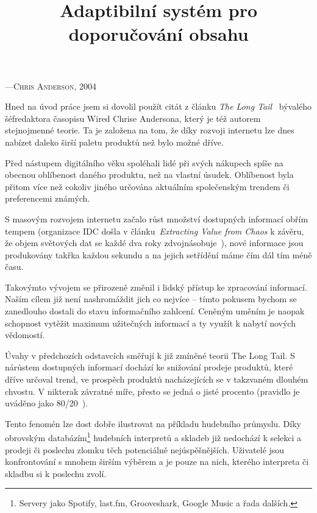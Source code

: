 \documentclass[thesis=M,czech]{FITthesis}[2014/05/07]
\title{Adaptibilní systém pro doporučování obsahu}
\begin{document}

\begin{introduction}
\begin{epigraphs}
%
 {---\textsc{Chris Anderson, 2004}}
 \end{epigraphs}	
	Hned na úvod práce jsem si dovolil použít citát z článku \emph{The Long Tail}~\cite{anderson} bývalého šéfredaktora časopisu Wired Chrise Andersona, který je též autorem stejnojmenné teorie. Ta je založena na tom, že díky rozvoji internetu lze dnes nabízet daleko širší paletu produktů než bylo možné dříve.
	
	Před nástupem digitálního věku spoléhali lidé při svých nákupech spíše na obecnou oblíbenost daného produktu, než na vlastní úsudek. Oblíbenost byla přitom více než cokoliv jiného určována aktuálním společenským trendem či preferencemi známých.	

	S masovým rozvojem internetu začalo růst množství dostupných informací obřím tempem (organizace IDC došla v článku~\emph{Extracting Value from Chaos} k závěru, že objem světových dat se každé dva roky zdvojnásobuje~\cite{digitaluniverse}), nové informace jsou produkovány takřka každou sekundu a na jejich setřídění máme čím dál tím méně času.
	
	Takovýmto vývojem se přirozeně změnil i lidský přístup ke zpracování informací. Naším cílem již není nashromáždit jich co nejvíce – tímto pokusem bychom se zanedlouho dostali do stavu informačního zahlcení. Ceněným uměním je naopak schopnost vytěžit maximum užitečných informací a ty využít k nabytí nových vědomostí.
	
	Úvahy v předchozích odstavcích směřují k již zmíněné teorii The Long Tail. S nárůstem dostupných informací dochází ke snižování prodeje produktů, které dříve určoval trend, ve prospěch produktů nacházejících se v takzvaném dlouhém chvostu. V nikterak závratné míře, přesto se jedná o jisté procento (pravidlo je uváděno jako 80/20~\cite{longtail2}). 
	
	Tento fenomén lze dost dobře ilustrovat na příkladu hudebního průmyslu. Díky obrovským databázím\footnote{Servery jako Spotify, last.fm, Grooveshark, Google Music a řada dalších.} hudebních interpretů a skladeb již nedochází k selekci a prodeji či poslechu zlomku těch potenciálně nejúspěšnějších. Uživatelé jsou konfrontování s mnohem širším výběrem a je pouze na nich, kterého interpreta či skladbu si k poslechu zvolí.		


\end{introduction}
\end{document}
